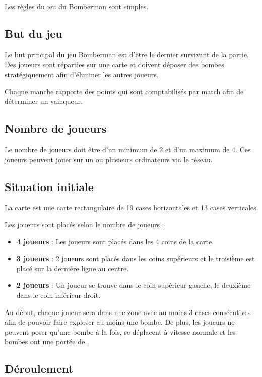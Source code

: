 Les règles du jeu du Bomberman sont simples.

\subsection{But du jeu}

Le but principal du jeu Bomberman est d'être le dernier survivant de la partie. Des joueurs sont réparties sur une carte et doivent déposer des bombes stratégiquement afin d'éliminer les autres joueurs.

Chaque manche rapporte des points qui sont comptabilisés par match afin de déterminer un vainqueur.

\subsection{Nombre de joueurs}

Le nombre de joueurs doit être d'un minimum de 2 et d'un maximum de 4. Ces joueurs peuvent jouer sur un ou plusieurs ordinateurs via le réseau.

\subsection{Situation initiale}

La carte est une carte rectangulaire de 19 cases horizontales et 13 cases verticales.

Les joueurs sont placés selon le nombre de joueurs : 
\begin{itemize}
\item \textbf{4 joueurs} : Les joueurs sont placés dans les 4 coins de la carte.
\item \textbf{3 joueurs} : 2 joueurs sont placés dans les coins supérieurs et le troisième est placé sur la dernière ligne au centre.
\item \textbf{2 joueurs} : Un joueur se trouve dans le coin supérieur gauche, le deuxième dans le coin inférieur droit.
\end{itemize}

Au début, chaque joueur sera dans une zone avec au moins 3 cases consécutives afin de pouvoir faire exploser au moins une bombe. De plus, les joueurs ne peuvent poser qu'une bombe à la fois, se déplacent à vitesse normale et les bombes ont une portée de \porteeParDefaut .

\subsection{Déroulement}

